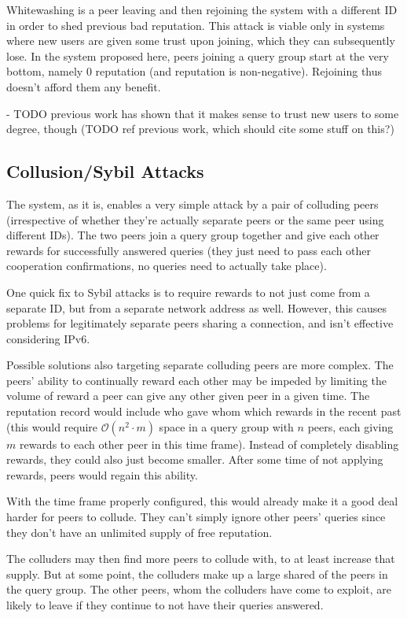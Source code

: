 Whitewashing is a peer leaving and then rejoining the system with a different ID
in order to shed previous bad reputation. This attack is viable only in systems
where new users are given some trust upon joining, which they can subsequently
lose. In the system proposed here, peers joining a query group start at the very
bottom, namely 0 reputation (and reputation is non-negative). Rejoining thus
doesn't afford them any benefit.

- TODO previous work has shown that it makes sense to trust new users to some
  degree, though
(TODO ref previous work, which should cite some stuff on this?)

\subsection{Collusion/Sybil Attacks}
\label{sec:desc_collusion_sybil_attacks}
The system, as it is, enables a very simple attack by a pair of colluding peers
(irrespective of whether they're actually separate peers or the same peer using
different IDs). The two peers join a query group together and give each other
rewards for successfully answered queries (they just need to pass each other
cooperation confirmations, no queries need to actually take place).

One quick fix to Sybil attacks is to require rewards to not just come from a
separate ID, but from a separate network address as well. However, this causes
problems for legitimately separate peers sharing a connection, and isn't
effective considering IPv6.

Possible solutions also targeting separate colluding peers are more complex. The
peers' ability to continually reward each other may be impeded by limiting the
volume of reward a peer can give any other given peer in a given time. The
reputation record would include who gave whom which rewards in the recent past
(this would require $\mathcal{O}(n^2 \cdot m)$ space in a query group with $n$
peers, each giving $m$ rewards to each other peer in this time frame). Instead
of completely disabling rewards, they could also just become smaller. After some
time of not applying rewards, peers would regain this ability.

With the time frame properly configured, this would already make it a good deal
harder for peers to collude. They can't simply ignore other peers' queries since
they don't have an unlimited supply of free reputation.

The colluders may then find more peers to collude with, to at least increase
that supply. But at some point, the colluders make up a large shared of the
peers in the query group. The other peers, whom the colluders have come to
exploit, are likely to leave if they continue to not have their queries
answered.

